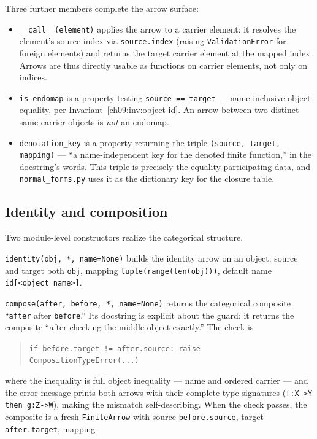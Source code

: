 Three further members complete the arrow surface:
\begin{itemize}
\item \texttt{\_\_call\_\_(element)} applies the arrow to a carrier
      element: it resolves the element's source index via
      \texttt{source.index} (raising \texttt{ValidationError} for foreign
      elements) and returns the target carrier element at the mapped index.
      Arrows are thus directly usable as functions on carrier elements, not
      only on indices.
\item \texttt{is\_endomap} is a property testing \texttt{source == target}
      --- name-inclusive object equality, per
      Invariant~\ref{ch09:inv:object-id}. An arrow between two distinct
      same-carrier objects is \emph{not} an endomap.
\item \texttt{denotation\_key} is a property returning the triple
      \texttt{(source, target, mapping)} --- ``a name-independent key for
      the denoted finite function,'' in the docstring's words. This triple
      is precisely the equality-participating data, and
      \texttt{normal\_forms.py} uses it as the dictionary key for the
      closure table.
\end{itemize}

\subsection{Identity and composition}\label{ch09:sec:compose}

Two module-level constructors realize the categorical structure.

\texttt{identity(obj, *, name=None)} builds the identity arrow on an
object: source and target both \texttt{obj}, mapping
\texttt{tuple(range(len(obj)))}, default name \texttt{id[<object name>]}.

\texttt{compose(after, before, *, name=None)} returns the categorical
composite ``\texttt{after} after \texttt{before}.'' Its docstring is
explicit about the guard: it returns the composite ``after checking the
middle object exactly.'' The check is

\begin{quote}
\texttt{if before.target != after.source: raise CompositionTypeError(...)}
\end{quote}

where the inequality is full object inequality --- name and ordered carrier
--- and the error message prints both arrows with their complete type
signatures (\texttt{f:X->Y then g:Z->W}), making the mismatch
self-describing. When the check passes, the composite is a fresh
\texttt{FiniteArrow} with source \texttt{before.source}, target
\texttt{after.target}, mapping

